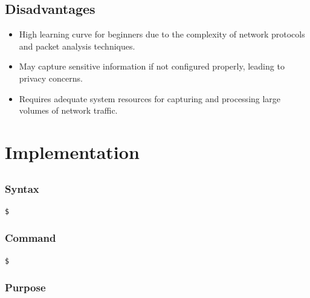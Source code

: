 \documentclass[11pt]{article}
\begin{document}
\subsection{Disadvantages}
\begin{itemize}
    \item High learning curve for beginners due to the complexity of network protocols and packet analysis techniques.
    \item May capture sensitive information if not configured properly, leading to privacy concerns.
    \item Requires adequate system resources for capturing and processing large volumes of network traffic.
\end{itemize}

\section{Implementation}

\subsection{}

\subsubsection*{Syntax}
\begin{verbatim}
$
\end{verbatim}

\subsubsection*{Command}
\begin{verbatim}
$
\end{verbatim}

\subsubsection*{Purpose}
\end{document}
